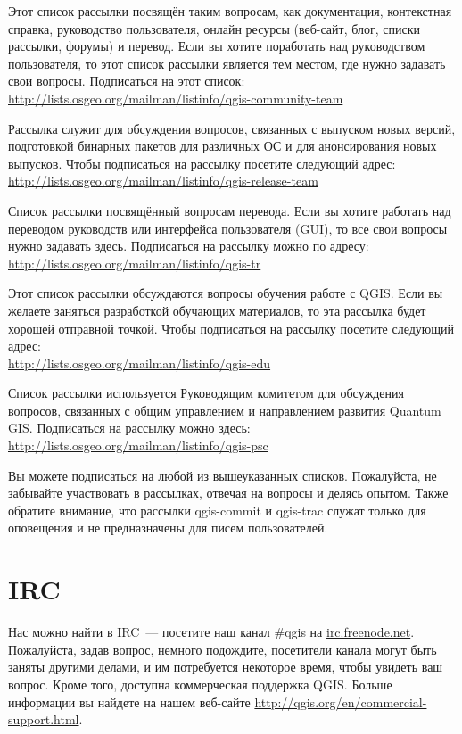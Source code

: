 Этот список рассылки посвящён таким вопросам, как документация,
контекстная справка, руководство пользователя, онлайн ресурсы (веб-сайт,
блог, списки рассылки, форумы) и перевод. Если вы хотите поработать над
руководством пользователя, то этот список рассылки является тем местом,
где нужно задавать свои вопросы. Подписаться на этот список: \\
\url{http://lists.osgeo.org/mailman/listinfo/qgis-community-team}

Рассылка служит для обсуждения вопросов, связанных с выпуском новых
версий, подготовкой бинарных пакетов для различных ОС и для
анонсирования новых выпусков. Чтобы подписаться на рассылку посетите
следующий адрес:\\
\url{http://lists.osgeo.org/mailman/listinfo/qgis-release-team}


Список рассылки посвящённый вопросам перевода. Если вы хотите работать над
переводом руководств или интерфейса пользователя (GUI), то все свои вопросы
нужно задавать здесь. Подписаться на рассылку можно по адресу:\\
\url{http://lists.osgeo.org/mailman/listinfo/qgis-tr}


Этот список рассылки обсуждаются вопросы обучения работе с QGIS. Если вы
желаете заняться разработкой обучающих материалов, то эта рассылка будет
хорошей отправной точкой. Чтобы подписаться на рассылку посетите следующий
адрес:\\
\url{http://lists.osgeo.org/mailman/listinfo/qgis-edu}

Список рассылки используется Руководящим комитетом для обсуждения
вопросов, связанных с общим управлением и направлением развития Quantum
GIS. Подписаться на рассылку можно здесь:\\
\url{http://lists.osgeo.org/mailman/listinfo/qgis-psc}

Вы можете подписаться на любой из вышеуказанных списков. Пожалуйста, не
забывайте участвовать в рассылках, отвечая на вопросы и делясь опытом.
Также обратите внимание, что рассылки qgis-commit и qgis-trac служат
только для оповещения и не предназначены для писем пользователей.

\section{IRC}
Нас можно найти в IRC~--- посетите наш канал \#qgis на
\url{irc.freenode.net}. Пожалуйста, задав вопрос, немного подождите,
посетители канала могут быть заняты другими делами, и им потребуется
некоторое время, чтобы увидеть ваш вопрос. Кроме того, доступна
коммерческая поддержка QGIS. Больше информации вы найдете на нашем
веб-сайте \url{http://qgis.org/en/commercial-support.html}.

